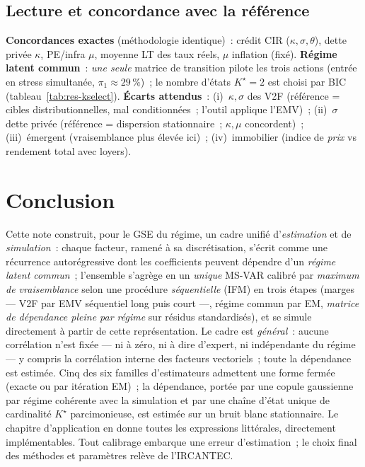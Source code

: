\documentclass[11pt,a4paper]{article}
\theoremstyle{definition}
\begin{document}
\subsection{Lecture et concordance avec la référence}
\label{sec:resultats-discussion}
\begin{insightbox}
\textbf{Concordances exactes} (méthodologie identique)~: crédit CIR ($\kappa,\sigma,\theta$), dette privée $\kappa$, PE/infra $\mu$, moyenne LT des taux réels, $\mu$ inflation (fixé). \textbf{Régime latent commun}~: \emph{une seule} matrice de transition pilote les trois actions (entrée en stress simultanée, $\pi_1\approx29\,\%$)~; le nombre d'états $K^\star=2$ est choisi par BIC (tableau~\ref{tab:res-kselect}). \textbf{Écarts attendus}~: (i)~$\kappa,\sigma$ des V2F (référence = cibles distributionnelles, mal conditionnées~; l'outil applique l'EMV)~; (ii)~$\sigma$ dette privée (référence = dispersion stationnaire~; $\kappa,\mu$ concordent)~; (iii)~émergent (vraisemblance plus élevée ici)~; (iv)~immobilier (indice de \emph{prix} vs rendement total avec loyers).
\end{insightbox}

\section{Conclusion}
Cette note construit, pour le GSE du régime, un cadre unifié d'\emph{estimation} et de \emph{simulation}~: chaque facteur, ramené à sa discrétisation, s'écrit comme une récurrence autorégressive dont les coefficients peuvent dépendre d'un \emph{régime latent commun}~; l'ensemble s'agrège en un \emph{unique} MS-VAR calibré par \emph{maximum de vraisemblance} selon une procédure \emph{séquentielle} (IFM) en trois étapes (marges --- V2F par EMV séquentiel long puis court ---, régime commun par EM, \emph{matrice de dépendance pleine par régime} sur résidus standardisés), et se simule directement à partir de cette représentation. Le cadre est \emph{général}~: aucune corrélation n'est fixée --- ni à zéro, ni à dire d'expert, ni indépendante du régime --- y compris la corrélation interne des facteurs vectoriels~; toute la dépendance est estimée. Cinq des six familles d'estimateurs admettent une forme fermée (exacte ou par itération EM)~; la dépendance, portée par une copule gaussienne par régime cohérente avec la simulation et par une chaîne d'état unique de cardinalité $K^\star$ parcimonieuse, est estimée sur un bruit blanc stationnaire. Le chapitre d'application en donne toutes les expressions littérales, directement implémentables. Tout calibrage embarque une erreur d'estimation~; le choix final des méthodes et paramètres relève de l'IRCANTEC.
\end{document}
